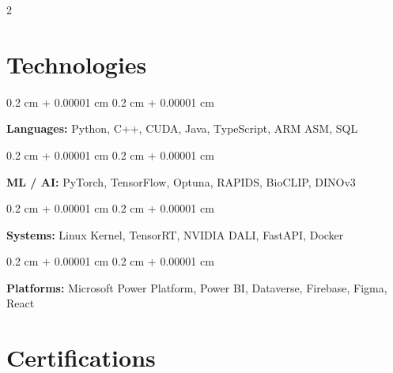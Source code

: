 \documentclass[10pt, letterpaper]{article}
\newenvironment{onecolentry}{
    \begin{adjustwidth}{
        0.2 cm + 0.00001 cm
    }{
        0.2 cm + 0.00001 cm
    }
}{
    \end{adjustwidth}
} %
\begin{document}
\begin{paracol}{2}

    

    
    \section{Technologies}

        \begin{onecolentry}
            \textbf{Languages:} Python, C++, CUDA, Java, TypeScript, ARM ASM, SQL \end{onecolentry}

        \vspace{0.1 cm}

        \begin{onecolentry}
            \textbf{ML / AI:} PyTorch, TensorFlow, Optuna, RAPIDS, BioCLIP, DINOv3 \end{onecolentry}

        \vspace{0.1 cm}

        \begin{onecolentry}
            \textbf{Systems:} Linux Kernel, TensorRT, NVIDIA DALI, FastAPI, Docker \end{onecolentry}

        \vspace{0.1 cm}

        \begin{onecolentry}
            \textbf{Platforms:} Microsoft Power Platform, Power BI, Dataverse, Firebase, Figma, React \end{onecolentry}


    \section{Certifications}
        

\end{paracol}
\end{document}
